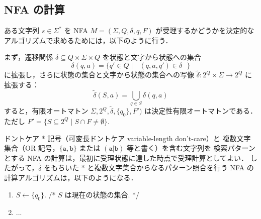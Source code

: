 \documentclass[11pt]{jreport}
\begin{document}
\subsection*{NFA の計算}

ある文字列 $s\in\Sigma^*$ を NFA $M = (\Sigma, Q, \delta, q, F)$ が受理するかどうかを決定的なアルゴリズムで求めるためには，以下のように行う．

まず，遷移関係 $\delta \subseteq Q \times \Sigma \times Q$ を状態と文字から状態への集合 
\[
\delta(q, a) = \{q' \in Q \mid \mbox{ $(q, a, q') \in \delta$ }\}
\]
に拡張し，さらに状態の集合と文字から状態の集合への写像 $\tilde\delta: 2^Q \times \Sigma \to 2^Q$ に拡張する：
\[
\tilde\delta(S, a) = \bigcup_{q \in S} \delta(q, a)
\]
すると，有限オートマトン $\Sigma, 2^Q, \tilde\delta, \{q_0\}, F')$ は決定性有限オートマトンである．
ただし $F' = \{ S \subseteq 2^Q \mid S\cap F \neq \emptyset\}$. 


ドントケア * 記号（可変長ドントケア variable-length don't-care）と
複数文字集合（OR 記号，$\{\mathtt{a}, \mathtt{b}\}$ または $\mathtt{(a|b)}$ 等と書く）を含む文字列を
検索パターンとする NFA の計算は，最初に受理状態に達した時点で受理計算としてよい．
したがって，$\tilde\delta$ をもちいた
 * と複数文字集合からなるパターン照合を行う NFA の計算アルゴリズムは，以下のようになる．
 \begin{enumerate}
 \item $S \leftarrow \{q_0\}$.  /* $S$ は現在の状態の集合. */
 \item ...
 \end{enumerate}
\end{document}

